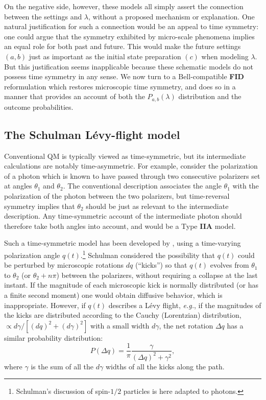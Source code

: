 \documentclass[rmp, aps, preprint, longbibliography]{revtex4-1}
\begin{document}
On the negative side, however, these models all simply assert the connection between the settings and $\lambda$, without a proposed mechanism or explanation.  One natural justification for such a connection would be an appeal to time symmetry: one could argue that the symmetry exhibited by micro-scale phenomena implies an equal role for both past and future.  This would make the future settings $(a,b)$ just as important as the initial state preparation $(c)$ when modeling $\lambda$.  But this justification seems inapplicable because these schematic models do not possess time symmetry in any sense.  We now turn to a Bell-compatible {\bf FID} reformulation which restores microscopic time symmetry, and does so in a manner that provides an account of both the $P_{a,b}(\lambda)$ distribution and the outcome probabilities.


\subsection{The Schulman L\'evy-flight model}
\label{sec:Schulman}

Conventional QM is typically viewed as time-symmetric, but its intermediate calculations are notably time-asymmetric.  For example, consider the polarization of a photon which is known to have passed through two consecutive polarizers set at angles $\theta_1$ and $\theta_2$.  The conventional description associates the angle $\theta_1$ with the polarization of the photon between the two polarizers, but time-reversal symmetry implies that $\theta_2$ should be just as relevant to the intermediate description.  Any time-symmetric account of the intermediate photon should therefore take both angles into account, and would be a Type {\bf IIA} model.

Such a time-symmetric model has been developed by \textcite{schulman1997,schulman2012}, using a time-varying polarization angle $q(t)$.\footnote{
Schulman's discussion of spin-$1/2$ particles is here adapted to photons.}  
Schulman considered the possibility that $q(t)$ could be perturbed by microscopic rotations $dq$ (``kicks'') so that $q(t)$ evolves from $\theta_1$ to $\theta_2$ (or $\theta_2 + n \pi$) between the polarizers, without requiring a collapse at the last instant.  If the magnitude of each microscopic kick is normally distributed (or has a finite second moment) one would obtain diffusive behavior, which is inappropriate.  However, if $q(t)$ describes a L\'evy flight, \emph{e.g.}, if the magnitudes of the kicks are distributed according to the Cauchy (Lorentzian) distribution, 
$\propto d\gamma / [{(dq)^2+(d\gamma)^2}]$ with a small width $d\gamma$, the net rotation $\Delta q$ has a similar probability distribution:
\begin{equation}
\label{eq:SProb}
P(\Delta q) = \frac{1}{\pi} \frac{\gamma}{(\Delta q)^2+\gamma^2},
\end{equation}
where $\gamma$ is the sum of all the $d\gamma$ widths of all the kicks along the path.
\end{document}
